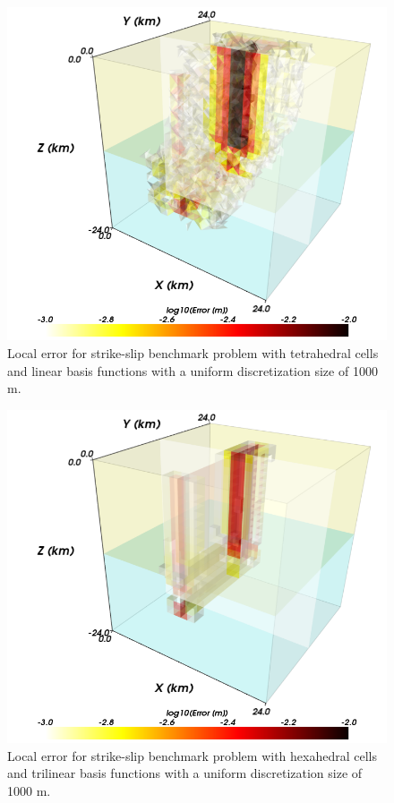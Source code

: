 \begin{figure}[htbp]
  \includegraphics[scale=0.33]{benchmarks/figs/strikeslip_error_tet4_1000m}
  \caption{Local error for strike-slip benchmark problem with
    tetrahedral cells and linear basis functions with a uniform
    discretization size of 1000 m.}
  \label{fig:benchmark:strikeslip:tet4:1000m}
\end{figure}

\begin{figure}[htbp]
  \includegraphics[scale=0.33]{benchmarks/figs/strikeslip_error_hex8_1000m}
  \caption{Local error for strike-slip benchmark problem with
    hexahedral cells and trilinear basis functions with a uniform
    discretization size of 1000 m.}
\label{fig:benchmark:strikeslip:hex8:1000m}
\end{figure}


